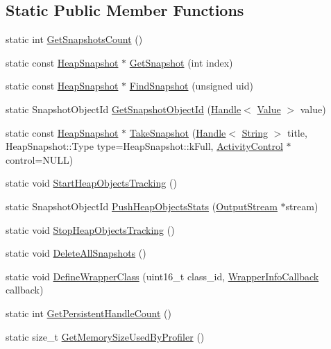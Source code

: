 \subsection*{Static Public Member Functions}
\begin{DoxyCompactItemize}
\item 
static int \hyperlink{classv8_1_1_heap_profiler_a739a665268bba6e640890464ccb60d26}{Get\+Snapshots\+Count} ()
\item 
static const \hyperlink{classv8_1_1_heap_snapshot}{Heap\+Snapshot} $\ast$ \hyperlink{classv8_1_1_heap_profiler_ad547f406908880cc7dc0453fe83cc216}{Get\+Snapshot} (int index)
\item 
static const \hyperlink{classv8_1_1_heap_snapshot}{Heap\+Snapshot} $\ast$ \hyperlink{classv8_1_1_heap_profiler_a1f77545176060f21239bd1a78e3967a7}{Find\+Snapshot} (unsigned uid)
\item 
static Snapshot\+Object\+Id \hyperlink{classv8_1_1_heap_profiler_ac15532477aaf5ad50ce569a240bf0dc8}{Get\+Snapshot\+Object\+Id} (\hyperlink{classv8_1_1_handle}{Handle}$<$ \hyperlink{classv8_1_1_value}{Value} $>$ value)
\item 
static const \hyperlink{classv8_1_1_heap_snapshot}{Heap\+Snapshot} $\ast$ \hyperlink{classv8_1_1_heap_profiler_a39e6df3b54335e183ca57edae1dc78e7}{Take\+Snapshot} (\hyperlink{classv8_1_1_handle}{Handle}$<$ \hyperlink{classv8_1_1_string}{String} $>$ title, Heap\+Snapshot\+::\+Type type=Heap\+Snapshot\+::k\+Full, \hyperlink{classv8_1_1_activity_control}{Activity\+Control} $\ast$control=N\+U\+L\+L)
\item 
static void \hyperlink{classv8_1_1_heap_profiler_a9f3073cb75f69c54b313ee5adfd1cbdc}{Start\+Heap\+Objects\+Tracking} ()
\item 
static Snapshot\+Object\+Id \hyperlink{classv8_1_1_heap_profiler_a62189d7a17f33bf6b33d7f550f906d24}{Push\+Heap\+Objects\+Stats} (\hyperlink{classv8_1_1_output_stream}{Output\+Stream} $\ast$stream)
\item 
static void \hyperlink{classv8_1_1_heap_profiler_a94d2c61cd403ca7caf1c366418db5776}{Stop\+Heap\+Objects\+Tracking} ()
\item 
static void \hyperlink{classv8_1_1_heap_profiler_af01cf79839c61b5cc6a92c422fd9875f}{Delete\+All\+Snapshots} ()
\item 
static void \hyperlink{classv8_1_1_heap_profiler_ae83d1fc891a24ecafdca44fca2dbe07a}{Define\+Wrapper\+Class} (uint16\+\_\+t class\+\_\+id, \hyperlink{classv8_1_1_heap_profiler_a696d8d6590879eeb5a4ad2814eafb599}{Wrapper\+Info\+Callback} callback)
\item 
static int \hyperlink{classv8_1_1_heap_profiler_a328b80376e88dd3dab7d5f3744c5fefd}{Get\+Persistent\+Handle\+Count} ()
\item 
static size\+\_\+t \hyperlink{classv8_1_1_heap_profiler_aa07c18bfcd873fec16e56680d3db4fbb}{Get\+Memory\+Size\+Used\+By\+Profiler} ()
\end{DoxyCompactItemize}
